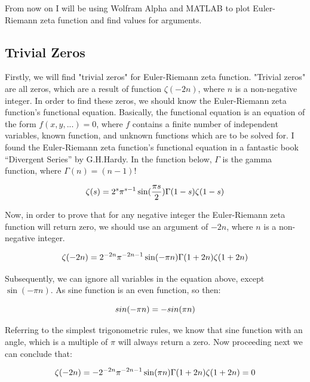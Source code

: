 \documentclass{beamer}
\begin{document}
From now on I will be using Wolfram Alpha and MATLAB to plot Euler-Riemann zeta function
and find values for arguments.\\

\subsection{Trivial Zeros}

Firstly, we will find "trivial zeros" for Euler-Riemann zeta function. "Trivial zeros" are all zeros,
which are a result of function $\zeta(-2n)$, where $n$ is a non-negative integer. In order to find these
zeros, we should know the Euler-Riemann zeta function's functional equation. Basically, the
functional equation \cite{Func}
is an equation of the form $f(x, y, ... ) = 0$, where $f$ contains a finite number
of independent variables, known function, and unknown functions which are to be solved for. I
found the Euler-Riemann zeta function's functional equation in a fantastic book
“Divergent Series” by G.H.Hardy.\cite{Hardy}
In the function below, $\Gamma$ is the gamma function, where $\Gamma(n) = (n-1)!$

\begin{equation}
  \zeta(s)=2^s\pi^{s-1}\sin(\frac{\pi s}{2})\Gamma(1-s)\zeta(1-s)\\
  \end{equation}

Now, in order to prove that for any negative integer the Euler-Riemann zeta function will return
zero, we should use an argument of $-2n$, where $n$ is a non-negative integer.

\begin{equation}
  \zeta(-2n)=2^{-2n}\pi^{-2n-1}\sin(-\pi n)\Gamma(1+2n)\zeta(1+2n)\\
  \end{equation}

Subsequently, we can ignore all variables in the equation above, except $\sin(-\pi n)$. As sine
function is an even function, so then:

\begin{equation}
  sin(-\pi n)=-sin(\pi n)\\
  \end{equation}

Referring to the simplest trigonometric rules, we know that sine function with an angle, which is a
multiple of $\pi$ will always return a zero. Now proceeding next we can conclude that:

\begin{equation*}
  \zeta(-2n)=-2^{-2n}\pi^{-2n-1}\sin(\pi n)\Gamma(1+2n)\zeta(1+2n)=0\\
  \end{equation*}
\end{document}

